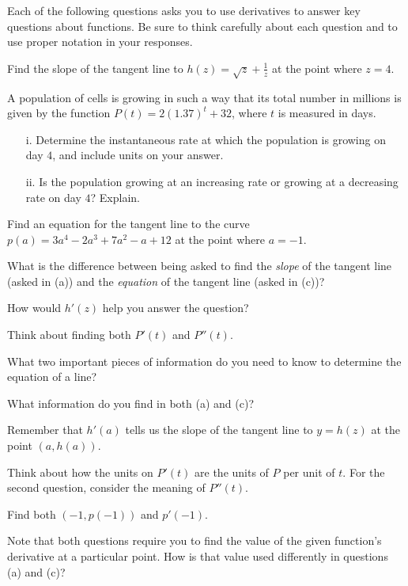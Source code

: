\begin{activity} \label{A:2.4.3}  
Each of the following questions asks you to use derivatives to answer key questions about functions.  Be sure to think carefully about each question and to use proper notation in your responses.
\ba
	\item Find the slope of the tangent line to $h(z) = \sqrt{z} + \frac{1}{z}$ at the point where $z = 4$.
	\item A population of cells is growing in such a way that its total number in millions is given by the function $P(t) = 2(1.37)^t + 32$, where $t$ is measured in days.  
	\begin{enumerate}
	  \item[i.] Determine the instantaneous rate at which the population is growing on day $4$, and include units on your answer.  
	  \item[ii.] Is the population growing at an increasing rate or growing at a decreasing rate on day $4$?  Explain.
	\end{enumerate}
	\item Find an equation for the tangent line to the curve $p(a) = 3a^4 - 2a^3 + 7a^2 - a + 12$ at the point where $a=-1$.
	\item What is the difference between being asked to find the \emph{slope} of the tangent line (asked in (a)) and the \emph{equation} of the tangent line (asked in (c))?
\ea
\end{activity}
\begin{smallhint}
\ba
	  \item How would $h'(z)$ help you answer the question?
	  \item Think about finding both $P'(t)$ and $P''(t)$.
	  \item What two important pieces of information do you need to know to determine the equation of a line?
	  \item What information do you find in both (a) and (c)?
\ea
\end{smallhint}
\begin{bighint}
\ba
	  \item Remember that $h'(a)$ tells us the slope of the tangent line to $y = h(z)$ at the point $(a,h(a))$.
	  \item Think about how the units on $P'(t)$ are the units of $P$ per unit of $t$.  For the second question, consider the meaning of $P''(t)$.
	  \item Find both $(-1,p(-1))$ and $p'(-1)$.
	  \item Note that both questions require you to find the value of the given function's derivative at a particular point.  How is that value used differently in questions (a) and (c)?
\ea
\end{bighint}
